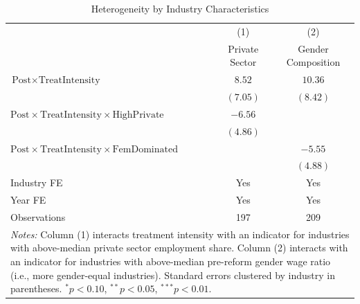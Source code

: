\begin{table}[t]
\centering
\caption{Heterogeneity by Industry Characteristics}
\label{tab:hetero}
\begin{tabular}{lcc}
\hline\hline
 & (1) & (2) \\
 & Private Sector & Gender Composition \\
\hline
$\text{Post} \times \text{TreatIntensity}$ & $8.52$ & $10.36$ \\
 & $(7.05)$ & $(8.42)$ \\[3pt]
$\text{Post} \times \text{TreatIntensity} \times \text{HighPrivate}$ & $-6.56$ & \\
 & $(4.86)$ & \\[3pt]
$\text{Post} \times \text{TreatIntensity} \times \text{FemDominated}$ & & $-5.55$ \\
 & & $(4.88)$ \\[6pt]
Industry FE & Yes & Yes \\
Year FE & Yes & Yes \\
Observations & 197 & 209 \\
\hline\hline
\multicolumn{3}{p{0.85\textwidth}}{\footnotesize \textit{Notes:} Column (1) interacts treatment intensity with an indicator for industries with above-median private sector employment share. Column (2) interacts with an indicator for industries with above-median pre-reform gender wage ratio (i.e., more gender-equal industries). Standard errors clustered by industry in parentheses. $^{*}p<0.10$, $^{**}p<0.05$, $^{***}p<0.01$.} \\
\end{tabular}
\end{table}

